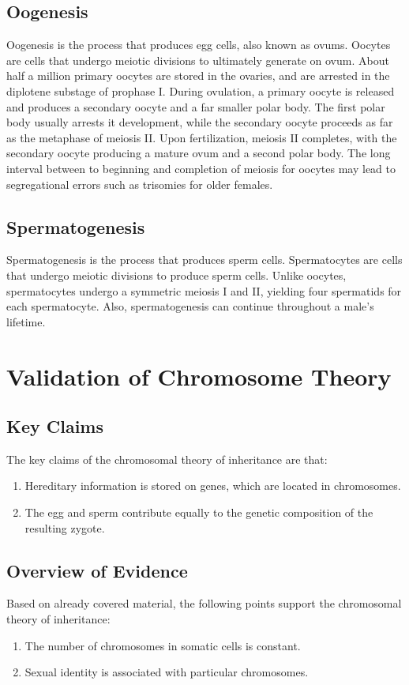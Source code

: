 \documentclass[12pt,titlepage]{article}
\begin{document}
      \subsection{Oogenesis}
        Oogenesis is the process that produces egg cells, also known as ovums. Oocytes are cells that undergo meiotic divisions to ultimately generate on ovum. About half
        a million primary oocytes are stored in the ovaries, and are arrested in the diplotene substage of prophase I. During ovulation, a primary oocyte is released and
        produces a secondary oocyte and a far smaller polar body. The first polar body usually arrests it development, while the secondary oocyte proceeds as far as the
        metaphase of meiosis II. Upon fertilization, meiosis II completes, with the secondary oocyte producing a mature ovum and a second polar body. The long interval
        between to beginning and completion of meiosis for oocytes may lead to segregational errors such as trisomies for older females.

      \subsection{Spermatogenesis}
        Spermatogenesis is the process that produces sperm cells. Spermatocytes are cells that undergo meiotic divisions to produce sperm cells. Unlike oocytes,
        spermatocytes undergo a symmetric meiosis I and II, yielding four spermatids for each spermatocyte. Also, spermatogenesis can continue throughout a male's lifetime.

    \section{Validation of Chromosome Theory}

      \subsection{Key Claims}
        The key claims of the chromosomal theory of inheritance are that:
        \begin{enumerate}
          \item Hereditary information is stored on genes, which are located in chromosomes.
          \item The egg and sperm contribute equally to the genetic composition of the resulting zygote.
        \end{enumerate}

      \subsection{Overview of Evidence}
        Based on already covered material, the following points support the chromosomal theory of inheritance:
        \begin{enumerate}
          \item The number of chromosomes in somatic cells is constant.
          \item Sexual identity is associated with particular chromosomes.
        \end{enumerate}
\end{document}
